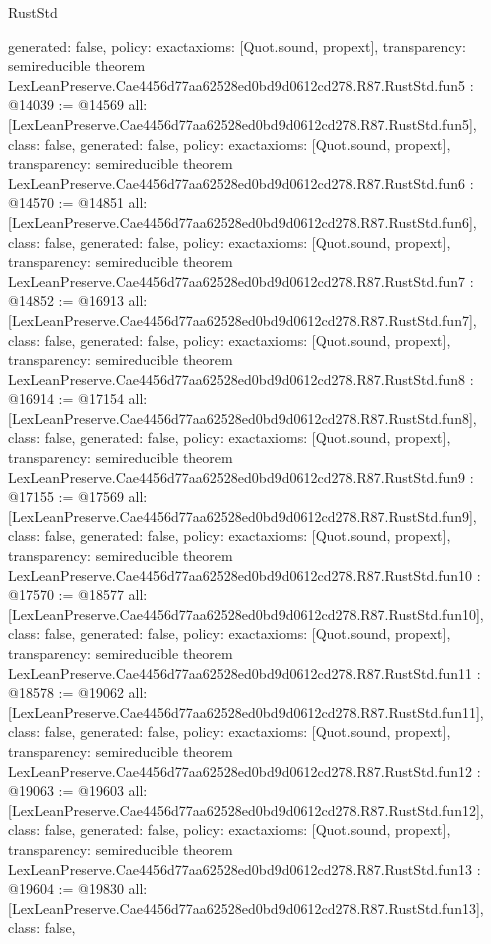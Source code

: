 \begin{lexlean}{RustStd}
\begin{coremodule}
{  generated: false,
  policy: exact{axioms: [Quot.sound, propext]},
  transparency: semireducible
}
theorem LexLeanPreserve.Cae4456d77aa62528ed0bd9d0612cd278.R87.RustStd.fun5 : @14039 := @14569 {
  all: [LexLeanPreserve.Cae4456d77aa62528ed0bd9d0612cd278.R87.RustStd.fun5],
  class: false,
  generated: false,
  policy: exact{axioms: [Quot.sound, propext]},
  transparency: semireducible
}
theorem LexLeanPreserve.Cae4456d77aa62528ed0bd9d0612cd278.R87.RustStd.fun6 : @14570 := @14851 {
  all: [LexLeanPreserve.Cae4456d77aa62528ed0bd9d0612cd278.R87.RustStd.fun6],
  class: false,
  generated: false,
  policy: exact{axioms: [Quot.sound, propext]},
  transparency: semireducible
}
theorem LexLeanPreserve.Cae4456d77aa62528ed0bd9d0612cd278.R87.RustStd.fun7 : @14852 := @16913 {
  all: [LexLeanPreserve.Cae4456d77aa62528ed0bd9d0612cd278.R87.RustStd.fun7],
  class: false,
  generated: false,
  policy: exact{axioms: [Quot.sound, propext]},
  transparency: semireducible
}
theorem LexLeanPreserve.Cae4456d77aa62528ed0bd9d0612cd278.R87.RustStd.fun8 : @16914 := @17154 {
  all: [LexLeanPreserve.Cae4456d77aa62528ed0bd9d0612cd278.R87.RustStd.fun8],
  class: false,
  generated: false,
  policy: exact{axioms: [Quot.sound, propext]},
  transparency: semireducible
}
theorem LexLeanPreserve.Cae4456d77aa62528ed0bd9d0612cd278.R87.RustStd.fun9 : @17155 := @17569 {
  all: [LexLeanPreserve.Cae4456d77aa62528ed0bd9d0612cd278.R87.RustStd.fun9],
  class: false,
  generated: false,
  policy: exact{axioms: [Quot.sound, propext]},
  transparency: semireducible
}
theorem LexLeanPreserve.Cae4456d77aa62528ed0bd9d0612cd278.R87.RustStd.fun10 : @17570 := @18577 {
  all: [LexLeanPreserve.Cae4456d77aa62528ed0bd9d0612cd278.R87.RustStd.fun10],
  class: false,
  generated: false,
  policy: exact{axioms: [Quot.sound, propext]},
  transparency: semireducible
}
theorem LexLeanPreserve.Cae4456d77aa62528ed0bd9d0612cd278.R87.RustStd.fun11 : @18578 := @19062 {
  all: [LexLeanPreserve.Cae4456d77aa62528ed0bd9d0612cd278.R87.RustStd.fun11],
  class: false,
  generated: false,
  policy: exact{axioms: [Quot.sound, propext]},
  transparency: semireducible
}
theorem LexLeanPreserve.Cae4456d77aa62528ed0bd9d0612cd278.R87.RustStd.fun12 : @19063 := @19603 {
  all: [LexLeanPreserve.Cae4456d77aa62528ed0bd9d0612cd278.R87.RustStd.fun12],
  class: false,
  generated: false,
  policy: exact{axioms: [Quot.sound, propext]},
  transparency: semireducible
}
theorem LexLeanPreserve.Cae4456d77aa62528ed0bd9d0612cd278.R87.RustStd.fun13 : @19604 := @19830 {
  all: [LexLeanPreserve.Cae4456d77aa62528ed0bd9d0612cd278.R87.RustStd.fun13],
  class: false,
}
\end{coremodule}
\end{lexlean}
